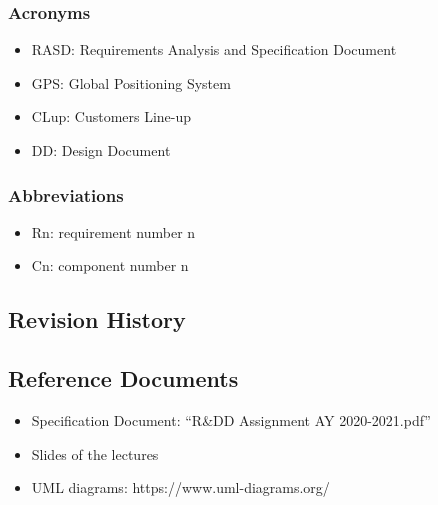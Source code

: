 		\subsubsection{Acronyms}
		\begin{itemize}
			\item \textcolor{BrickRed}{RASD}: Requirements Analysis and Specification Document 
			\item \textcolor{BrickRed}{GPS}: Global Positioning System
			\item \textcolor{BrickRed}{CLup}: Customers Line-up
			\item \textcolor{BrickRed}{DD}: Design Document 
		\end{itemize}
		
		\subsubsection{Abbreviations}
		\begin{itemize}
			\item \textcolor{BrickRed}{Rn}: requirement number n
			\item \textcolor{BrickRed}{Cn}: component number n
		\end{itemize}
		
	\subsection{Revision History}
	
	\subsection{Reference Documents}
	\begin{itemize}
			\item \textcolor{BrickRed}{Specification Document}: “R\&DD Assignment AY 2020-2021.pdf”
			\item \textcolor{BrickRed}{Slides of the lectures}
			\item \textcolor{BrickRed}{UML diagrams: https://www.uml-diagrams.org/}
	\end{itemize}
		
